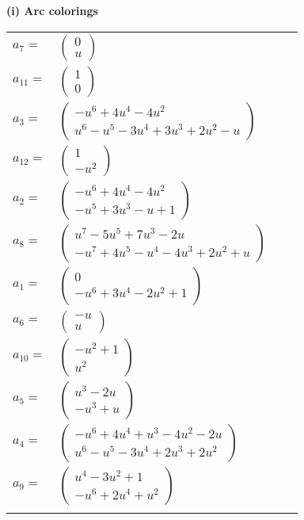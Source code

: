 \documentclass[1p]{elsarticle_modified}
\theoremstyle{definition}
\begin{document}
\flushleft \textbf{(i) Arc colorings}\\
\begin{tabular}{m{7pt} m{180pt} m{7pt} m{180pt} }
\flushright $a_{7}=$&$\begin{pmatrix}0\\u\end{pmatrix}$ \\
\flushright $a_{11}=$&$\begin{pmatrix}1\\0\end{pmatrix}$ \\
\flushright $a_{3}=$&$\begin{pmatrix}- u^6+4 u^4-4 u^2\\u^6- u^5-3 u^4+3 u^3+2 u^2- u\end{pmatrix}$ \\
\flushright $a_{12}=$&$\begin{pmatrix}1\\- u^2\end{pmatrix}$ \\
\flushright $a_{2}=$&$\begin{pmatrix}- u^6+4 u^4-4 u^2\\- u^5+3 u^3- u+1\end{pmatrix}$ \\
\flushright $a_{8}=$&$\begin{pmatrix}u^7-5 u^5+7 u^3-2 u\\- u^7+4 u^5- u^4-4 u^3+2 u^2+u\end{pmatrix}$ \\
\flushright $a_{1}=$&$\begin{pmatrix}0\\- u^6+3 u^4-2 u^2+1\end{pmatrix}$ \\
\flushright $a_{6}=$&$\begin{pmatrix}- u\\u\end{pmatrix}$ \\
\flushright $a_{10}=$&$\begin{pmatrix}- u^2+1\\u^2\end{pmatrix}$ \\
\flushright $a_{5}=$&$\begin{pmatrix}u^3-2 u\\- u^3+u\end{pmatrix}$ \\
\flushright $a_{4}=$&$\begin{pmatrix}- u^6+4 u^4+u^3-4 u^2-2 u\\u^6- u^5-3 u^4+2 u^3+2 u^2\end{pmatrix}$ \\
\flushright $a_{9}=$&$\begin{pmatrix}u^4-3 u^2+1\\- u^6+2 u^4+u^2\end{pmatrix}$\\&\end{tabular}
\end{document}
